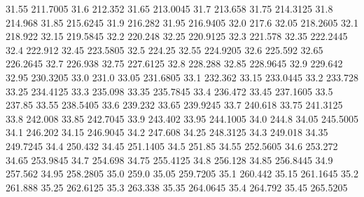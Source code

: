           31.55         211.7005
           31.6          212.352
          31.65         213.0045
           31.7          213.658
          31.75         214.3125
           31.8          214.968
          31.85         215.6245
           31.9          216.282
          31.95         216.9405
           32.0            217.6
          32.05         218.2605
           32.1          218.922
          32.15         219.5845
           32.2          220.248
          32.25         220.9125
           32.3          221.578
          32.35         222.2445
           32.4          222.912
          32.45         223.5805
           32.5           224.25
          32.55         224.9205
           32.6          225.592
          32.65         226.2645
           32.7          226.938
          32.75         227.6125
           32.8          228.288
          32.85         228.9645
           32.9          229.642
          32.95         230.3205
           33.0            231.0
          33.05         231.6805
           33.1          232.362
          33.15         233.0445
           33.2          233.728
          33.25         234.4125
           33.3          235.098
          33.35         235.7845
           33.4          236.472
          33.45         237.1605
           33.5           237.85
          33.55         238.5405
           33.6          239.232
          33.65         239.9245
           33.7          240.618
          33.75         241.3125
           33.8          242.008
          33.85         242.7045
           33.9          243.402
          33.95         244.1005
           34.0            244.8
          34.05         245.5005
           34.1          246.202
          34.15         246.9045
           34.2          247.608
          34.25         248.3125
           34.3          249.018
          34.35         249.7245
           34.4          250.432
          34.45         251.1405
           34.5           251.85
          34.55         252.5605
           34.6          253.272
          34.65         253.9845
           34.7          254.698
          34.75         255.4125
           34.8          256.128
          34.85         256.8445
           34.9          257.562
          34.95         258.2805
           35.0            259.0
          35.05         259.7205
           35.1          260.442
          35.15         261.1645
           35.2          261.888
          35.25         262.6125
           35.3          263.338
          35.35         264.0645
           35.4          264.792
          35.45         265.5205
